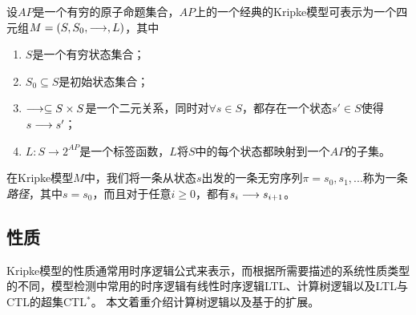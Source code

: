 \begin{definition}[经典的Kripke模型]
	设$AP$是一个有穷的原子命题集合，$AP$上的一个经典的Kripke模型可表示为一个四元组$M=(S,S_0,\longrightarrow,L)$，其中
	\begin{enumerate}
		\item $S$是一个有穷状态集合；
		\item $S_0\subseteq S$是初始状态集合；
		\item $\longrightarrow\subseteq S\times S$是一个二元关系，同时对$\forall s\in S$，都存在一个状态$s'\in S$使得$s\longrightarrow s'$；
		\item $L:S\rightarrow 2^{AP}$是一个标签函数，$L$将$S$中的每个状态都映射到一个$AP$的子集。
	\end{enumerate}
\end{definition}
在Kripke模型$M$中，我们将一条从状态$s$出发的一条无穷序列$\pi=s_0,s_1,...$称为一条\textit{路径}，其中$s=s_0$，而且对于任意$i\ge 0$，都有$s_i\longrightarrow s_{i+1}$。

\subsection{性质}
Kripke模型的性质通常用时序逻辑公式来表示，而根据所需要描述的系统性质类型的不同，模型检测中常用的时序逻辑有线性时序逻辑\textsf{LTL}\cite{Pnueli77}、计算树逻辑\CTL{}\cite{ClarkeE08}以及\textsf{LTL}与\textsf{CTL}的超集\textsf{CTL$^*$}\cite{EmersonH86}。
本文着重介绍计算树逻辑\CTL{}以及基于\CTL{}的扩展。

